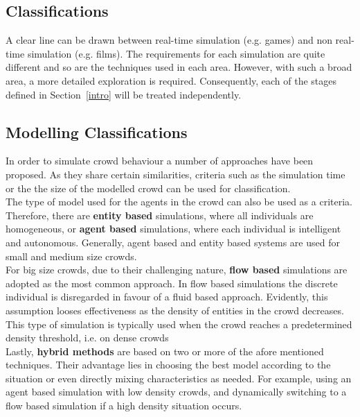 \documentclass[6pt]{article} %
\begin{document}
\begin{multicols}{2}
\section{Classifications}

A clear line can be drawn between real-time simulation (e.g. games) and non real-time simulation (e.g. films).
The requirements for each simulation are quite different and so are the techniques used in each area.
However, with such a broad area, a more detailed exploration is required.
Consequently, each of the stages defined in Section~\ref{intro} will be treated independently.

\subsection{Modelling Classifications}
\label{subsec:ModelClassification}

In order to simulate crowd behaviour a number of approaches have been proposed.
As they share certain similarities, criteria such as the simulation time or the the size of the modelled crowd can be used for classification.\\

The type of model used for the agents in the crowd can also be used as a criteria.
Therefore, there are \textbf{entity based} simulations, where all individuals are homogeneous, or \textbf{agent based} simulations, where each individual is intelligent and autonomous.
Generally, agent based and entity based systems are used for small and medium size crowds.\\

For big size crowds, due to their challenging nature, \textbf{flow based} simulations are adopted as the most common approach.
In flow based simulations the discrete individual is disregarded in favour of a fluid based approach.
Evidently, this assumption looses effectiveness as the density of entities in the crowd decreases.
This type of simulation is typically used when the crowd reaches a predetermined density threshold, i.e. on dense crowds\\

Lastly, \textbf{hybrid methods} are based on two or more of the afore mentioned techniques.
Their advantage lies in choosing the best model according to the situation or even directly mixing characteristics as needed.
For example, using an agent based simulation with low density crowds, and dynamically switching to a flow based simulation if a high density situation occurs.


\end{multicols}
\end{document}
